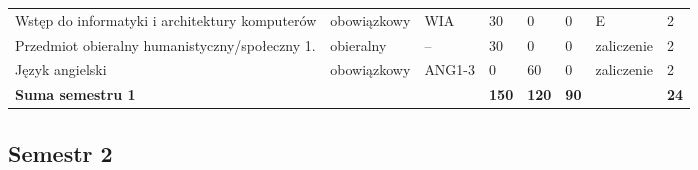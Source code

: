 \documentclass[12pt,a4paper]{article}
\begin{document}
{\begin{longtable}{>{\RaggedRight}m{5.0cm}m{1.9cm}m{0.75cm}m{0.85cm}m{0.85cm}m{0.85cm}m{1.45cm}m{0.9cm}}
\rowcolor{tableRowLight} Wstęp do informatyki i architektury komputerów & {\scriptsize obowiązkowy} & WIA & 30 & 0 & 0 & {\scriptsize E} & 2 \\
\rowcolor{tableElective} Przedmiot obieralny humanistyczny/społeczny 1. & {\scriptsize obieralny} & -- & 30 & 0 & 0 & {\scriptsize zaliczenie} & 2 \\
\rowcolor{tableRowLight} Język angielski & {\scriptsize obowiązkowy} & ANG1-3 & 0 & 60 & 0 & {\scriptsize zaliczenie} & 2 \\
\midrule[\heavyrulewidth]
\rowcolor{tableSummary} \textbf{Suma semestru 1} & & & \textbf{150} & \textbf{120} & \textbf{90} & & \textbf{24} \\
\bottomrule
\end{longtable}}

\subsection*{Semestr 2}
\end{document}
